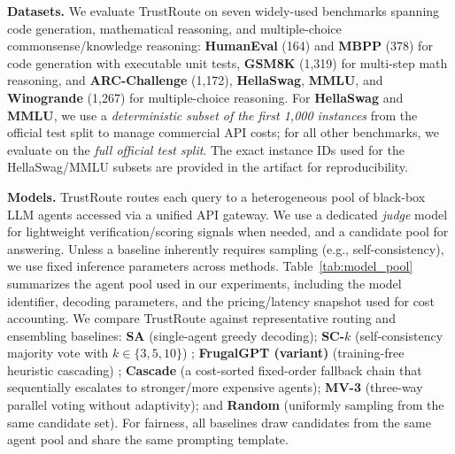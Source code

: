 \documentclass[acmsmall,screen,review,anonymous]{acmart}
\begin{document}
\textbf{Datasets.}
We evaluate TrustRoute on seven widely-used benchmarks spanning code generation, mathematical reasoning, and multiple-choice commonsense/knowledge reasoning:
\textbf{HumanEval} (164) and \textbf{MBPP} (378) for code generation with executable unit tests,
\textbf{GSM8K} (1{,}319) for multi-step math reasoning,
and \textbf{ARC-Challenge} (1{,}172), \textbf{HellaSwag}, \textbf{MMLU}, and \textbf{Winogrande} (1{,}267) for multiple-choice reasoning.
For \textbf{HellaSwag} and \textbf{MMLU}, we use a \emph{deterministic subset of the first 1,000 instances} from the official test split to manage commercial API costs; for all other benchmarks, we evaluate on the \emph{full official test split}.
The exact instance IDs used for the HellaSwag/MMLU subsets are provided in the artifact for reproducibility.


\textbf{Models.}
TrustRoute routes each query to a heterogeneous pool of black-box LLM agents accessed via a unified API gateway.
We use a dedicated \emph{judge} model for lightweight verification/scoring signals when needed, and a candidate pool for answering.
Unless a baseline inherently requires sampling (e.g., self-consistency), we use fixed inference parameters across methods.
Table~\ref{tab:model_pool} summarizes the agent pool used in our experiments, including the model identifier,
decoding parameters, and the pricing/latency snapshot used for cost accounting.
We compare TrustRoute against representative routing and ensembling baselines:
\textbf{SA} (single-agent greedy decoding);
\textbf{SC-$k$} (self-consistency majority vote with $k\in\{3,5,10\}$) \cite{wang2023selfconsistency};
\textbf{FrugalGPT (variant)} (training-free heuristic cascading) \cite{chen2023frugalgpt};
\textbf{Cascade} (a cost-sorted fixed-order fallback chain that sequentially escalates to stronger/more expensive agents);
\textbf{MV-3} (three-way parallel voting without adaptivity);
and \textbf{Random} (uniformly sampling from the same candidate set).
For fairness, all baselines draw candidates from the same agent pool and share the same prompting template.
\end{document}

